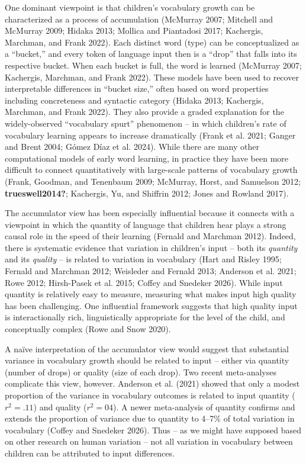\documentclass[
  11pt,
]{article}
\begin{document}
One dominant viewpoint is that children's vocabulary growth can be
characterized as a process of accumulation (McMurray 2007; Mitchell and
McMurray 2009; Hidaka 2013; Mollica and Piantadosi 2017; Kachergis,
Marchman, and Frank 2022). Each distinct word (type) can be
conceptualized as a ``bucket,'' and every token of language input then
is a ``drop'' that falls into its respective bucket. When each bucket is
full, the word is learned (McMurray 2007; Kachergis, Marchman, and Frank
2022). These models have been used to recover interpretable differences
in ``bucket size,'' often based on word properties including
concreteness and syntactic category (Hidaka 2013; Kachergis, Marchman,
and Frank 2022). They also provide a graded explanation for the
widely-observed ``vocabulary spurt'' phenomenon -- in which children's
rate of vocabulary learning appears to increase dramatically (Frank et
al. 2021; Ganger and Brent 2004; Gómez Díaz et al. 2024). While there
are many other computational models of early word learning, in practice
they have been more difficult to connect quantitatively with large-scale
patterns of vocabulary growth (Frank, Goodman, and Tenenbaum 2009;
McMurray, Horst, and Samuelson 2012; \textbf{trueswell2014?}; Kachergis,
Yu, and Shiffrin 2012; Jones and Rowland 2017).

The accumulator view has been especially influential because it connects
with a viewpoint in which the quantity of language that children hear
plays a strong causal role in the speed of their learning (Fernald and
Marchman 2012). Indeed, there is systematic evidence that variation in
children's input -- both its \emph{quantity} and its \emph{quality} --
is related to variation in vocabulary (Hart and Risley 1995; Fernald and
Marchman 2012; Weisleder and Fernald 2013; Anderson et al. 2021; Rowe
2012; Hirsh-Pasek et al. 2015; Coffey and Snedeker 2026). While input
quantity is relatively easy to measure, measuring what makes input high
quality has been challenging. One influential framework suggests that
high quality input is interactionally rich, linguistically appropriate
for the level of the child, and conceptually complex (Rowe and Snow
2020).

A naïve interpretation of the accumulator view would suggest that
substantial variance in vocabulary growth should be related to input --
either via quantity (number of drops) or quality (size of each drop).
Two recent meta-analyses complicate this view, however. Anderson et al.
(2021) showed that only a modest proportion of the variance in
vocabulary outcomes is related to input quantity (\(r^2 = .11\)) and
quality (\(r^2 = 04\)). A newer meta-analysis of quantity confirms and
extends the proportion of variance due to quantity to 4--7\% of total
variation in vocabulary (Coffey and Snedeker 2026). Thus -- as we might
have supposed based on other research on human variation -- not all
variation in vocabulary between children can be attributed to input
differences.
\end{document}
